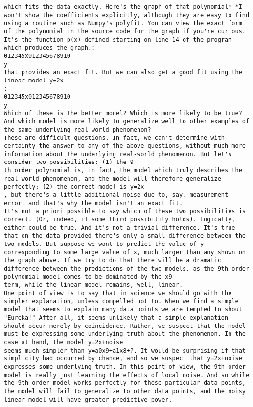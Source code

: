 \begin{lstlisting}
which fits the data exactly. Here's the graph of that polynomial* *I won't show the coefficients explicitly, although they are easy to find using a routine such as Numpy's polyfit. You can view the exact form of the polynomial in the source code for the graph if you're curious. It's the function p(x) defined starting on line 14 of the program which produces the graph.:
012345x012345678910
y
That provides an exact fit. But we can also get a good fit using the linear model y=2x
:
012345x012345678910
y
Which of these is the better model? Which is more likely to be true? And which model is more likely to generalize well to other examples of the same underlying real-world phenomenon?
These are difficult questions. In fact, we can't determine with certainty the answer to any of the above questions, without much more information about the underlying real-world phenomenon. But let's consider two possibilities: (1) the 9
th order polynomial is, in fact, the model which truly describes the real-world phenomenon, and the model will therefore generalize perfectly; (2) the correct model is y=2x
, but there's a little additional noise due to, say, measurement error, and that's why the model isn't an exact fit.
It's not a priori possible to say which of these two possibilities is correct. (Or, indeed, if some third possibility holds). Logically, either could be true. And it's not a trivial difference. It's true that on the data provided there's only a small difference between the two models. But suppose we want to predict the value of y
corresponding to some large value of x, much larger than any shown on the graph above. If we try to do that there will be a dramatic difference between the predictions of the two models, as the 9th order polynomial model comes to be dominated by the x9
term, while the linear model remains, well, linear.
One point of view is to say that in science we should go with the simpler explanation, unless compelled not to. When we find a simple model that seems to explain many data points we are tempted to shout "Eureka!" After all, it seems unlikely that a simple explanation should occur merely by coincidence. Rather, we suspect that the model must be expressing some underlying truth about the phenomenon. In the case at hand, the model y=2x+noise
seems much simpler than y=a0x9+a1x8+?. It would be surprising if that simplicity had occurred by chance, and so we suspect that y=2x+noise
expresses some underlying truth. In this point of view, the 9th order model is really just learning the effects of local noise. And so while the 9th order model works perfectly for these particular data points, the model will fail to generalize to other data points, and the noisy linear model will have greater predictive power.

\end{lstlisting}
